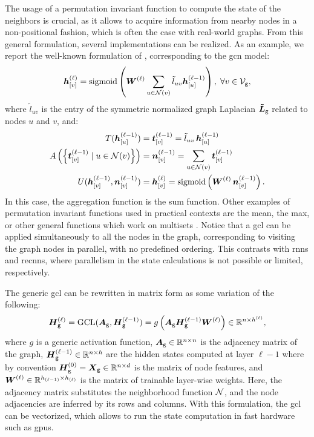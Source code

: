 The usage of a permutation invariant function to compute the state of the neighbors is crucial, as it allows to acquire information from nearby nodes in a non-positional fashion, which is often the case with real-world graphs. From this general formulation, several implementations can be realized. As an example, we report the well-known formulation of \citet{kipf2017semisupervisedgcn}, corresponding to the \gls{gcn} model:
\begin{align}
    \label{eq:convolutional}
    \StateVector{v}{\ell} = \sigmoid\Par{ \LayerMatrix{w}{\ell} \sum_{u \in \Neigh(v)} \tilde{l}_{uv}\StateVector{u}{\ell-1}}, \; \forall v \in \Nodes{g},
\end{align}
where $\tilde{l}_{uv}$ is the entry of the symmetric normalized graph Laplacian $\NormLaplacianMatrix{g}$ related to nodes $u$ and $v$, and:
\begin{align}
    \label{eq:transform}
    T(\StateVector{u}{\ell-1}) &= \GenStateVector{t}{v}{\ell-1}  = \tilde{l}_{uv}\,\StateVector{u}{\ell-1}\\
    \label{eq:aggregate}
    A\Par{\Set{\GenStateVector{t}{v}{\ell-1} \mid u \in \Neigh(v)}} &= \GenStateVector{n}{v}{\ell-1} = \sum_{u \in \Neigh(v)} \GenStateVector{t}{v}{\ell-1}\\
    \label{eq:update}
    U(\StateVector{v}{\ell-1}, \GenStateVector{n}{v}{\ell-1}) &= \StateVector{v}{\ell} =  \sigmoid\Par{\LayerMatrix{w}{\ell}\, \GenStateVector{n}{v}{\ell-1}}.
\end{align}
In this case, the aggregation function is the sum function. Other examples of permutation invariant functions used in practical contexts are the mean, the max, or other general functions which work on multisets \citep{zaheer2017deepsets}. Notice that a \gls{gcl} can be applied simultaneously to all the nodes in the graph, corresponding to visiting the graph nodes in parallel, with no predefined ordering. This contrasts with \glspl{rnn} and \glspl{recnn}, where parallelism in the state calculations is not possible or limited, respectively.

The generic \gls{gcl} can be rewritten in matrix form as some variation of the following:
$$\LayerStateMat{g}{\ell} = \Fun{GCL}(\AdjMatrix{g}, \LayerStateMat{g}{\ell-1}) = g\Par{\AdjMatrix{g}\LayerStateMat{g}{\ell-1}\LayerMatrix{w}{\ell}} \in \Real^{n \times h^{(\ell)}},$$
where $g$ is a generic activation function, $\AdjMatrix{g} \in \Real^{n \times n}$ is the adjacency matrix of the graph, $\LayerStateMat{g}{\ell-1} \in \Real^{n \times h}$ are the hidden states computed at layer $\ell-1$ where by convention $\LayerStateMat{g}{0} = \FeatureMatrix{g} \in \Real^{n \times d}$ is the matrix of node features, and $\LayerMatrix{w}{\ell} \in \Real^{h_{(\ell-1)} \times h_{(\ell)}}$ is the matrix of trainable layer-wise weights. Here, the adjacency matrix substitutes the neighborhood function $\Neigh$, and the node adjacencies are inferred by its rows and columns. With this formulation, the \gls{gcl} can be vectorized, which allows to run the state computation in fast hardware such as \glspl{gpu}.

